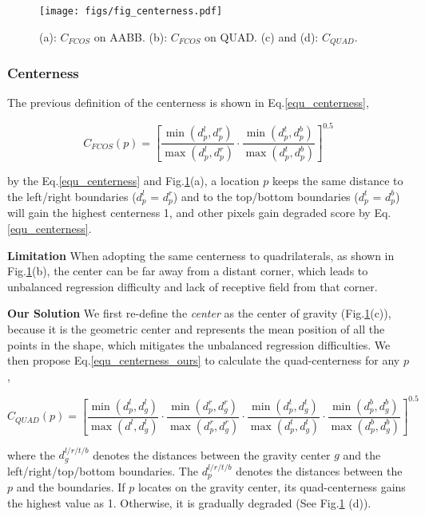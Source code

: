 \documentclass[runningheads]{llncs}
\begin{document}
\begin{figure}[t]
    \centering
    \texttt{[image: figs/fig\_centerness.pdf]}
    \caption{(a): $C_{FCOS}$ on AABB. (b): $C_{FCOS}$ on QUAD. (c) and (d): $C_{QUAD}$.}
    \label{fig:centerness}
\end{figure}

\subsubsection{Centerness}
The previous definition of the centerness \cite{tian2019fcos,zhu2020soft} is shown in Eq.\ref{equ_centerness},

\begin{equation}
C_{FCOS}(p) = [\frac{\min(d_{p}^l,d_{p}^r)}{\max(d_{p}^l, d_{p}^r) } \cdot \frac{\min(d_{p}^t, d_{p}^b)}{ \max(d_{p}^t, d_{p}^b)}]^{0.5}   
\label{equ_centerness}
\end{equation}

\noindent by the Eq.\ref{equ_centerness} and Fig.\ref{fig:centerness}(a), a location $p$ keeps the same distance to the left/right boundaries ($d_{p}^l$ = $d_{p}^r$) and to the top/bottom boundaries ($d_{p}^t$ = $d_{p}^b$) will gain the highest centerness 1, and other pixels gain degraded score by Eq.\ref{equ_centerness}. 

\textbf{Limitation} When adopting the same centerness to quadrilaterals, as shown in Fig.\ref{fig:centerness}(b), the center can be far away from a distant corner, which leads to unbalanced regression difficulty and lack of receptive field from that corner. 

\textbf{Our Solution} We first re-define the \textit{center} as the center of gravity (Fig.\ref{fig:centerness}(c)), because it is the geometric center and represents the mean position of all the points in the shape, which mitigates the unbalanced regression difficulties. We then propose Eq.\ref{equ_centerness_ours} to calculate the quad-centerness for any $p$,

\begin{equation}
C_{QUAD}(p) =
[\frac{\min(d_{p}^l,d_{g}^l)}{\max(d_{}^l, d_{g}^l) } \cdot \frac{\min(d_{p}^r,d_{g}^r)}{\max(d_{p}^r, d_{g}^r) } \cdot
\frac{\min(d_{p}^t,d_{g}^t)}{\max(d_{p}^t, d_{g}^t) } \cdot \frac{\min(d_{p}^b,d_{g}^b)}{\max(d_{p}^b, d_{g}^b) }]^{0.5} 
\label{equ_centerness_ours}
\end{equation}

\noindent where the $d_{g}^{l/r/t/b}$ denotes the distances between the gravity center $g$ and the left/right/top/bottom boundaries. The $d_p^{l/r/t/b}$ denotes the distances between the $p$ and the boundaries. If $p$ locates on the gravity center, its quad-centerness gains the highest value as 1. Otherwise, it is gradually degraded (See Fig.\ref{fig:centerness} (d)). 
\end{document}
